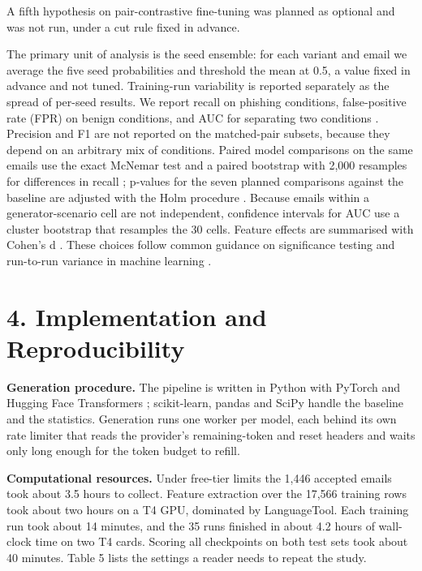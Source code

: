 \documentclass[11pt,letterpaper]{article}
\begin{document}
A fifth hypothesis on pair-contrastive fine-tuning was planned as optional and was not run, under a cut rule fixed in advance.

The primary unit of analysis is the seed ensemble: for each variant and email we average the five seed probabilities and threshold the mean at 0.5, a value fixed in advance and not tuned. Training-run variability is reported separately as the spread of per-seed results. We report recall on phishing conditions, false-positive rate (FPR) on benign conditions, and AUC for separating two conditions \cite{hanley1982}. Precision and F1 are not reported on the matched-pair subsets, because they depend on an arbitrary mix of conditions. Paired model comparisons on the same emails use the exact McNemar test \cite{mcnemar1947,dietterich1998} and a paired bootstrap with 2,000 resamples for differences in recall \cite{efron1993bootstrap}; p-values for the seven planned comparisons against the baseline are adjusted with the Holm procedure \cite{holm1979}. Because emails within a generator-scenario cell are not independent, confidence intervals for AUC use a cluster bootstrap that resamples the 30 cells. Feature effects are summarised with Cohen's d \cite{cohen1988statistical}. These choices follow common guidance on significance testing and run-to-run variance in machine learning \cite{dror2018,bouthillier2021}.

\section{4. Implementation and Reproducibility}

\textbf{Generation procedure.} The pipeline is written in Python with PyTorch \cite{paszke2019} and Hugging Face Transformers \cite{wolf2020}; scikit-learn, pandas and SciPy handle the baseline and the statistics. Generation runs one worker per model, each behind its own rate limiter that reads the provider's remaining-token and reset headers and waits only long enough for the token budget to refill.

\textbf{Computational resources.} Under free-tier limits the 1,446 accepted emails took about 3.5 hours to collect. Feature extraction over the 17,566 training rows took about two hours on a T4 GPU, dominated by LanguageTool. Each training run took about 14 minutes, and the 35 runs finished in about 4.2 hours of wall-clock time on two T4 cards. Scoring all checkpoints on both test sets took about 40 minutes. Table 5 lists the settings a reader needs to repeat the study.
\end{document}
